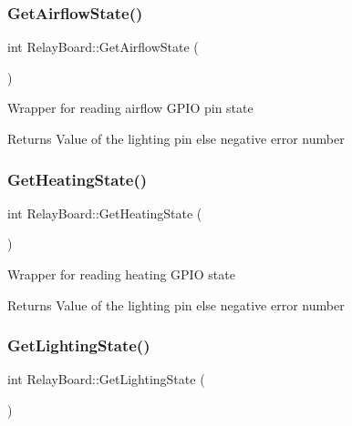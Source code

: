 \mbox{\label{classRelayBoard_a4b5cecaeadec360c688868a230a7d3a8}} 
\subsubsection{\texorpdfstring{Get\+Airflow\+State()}{GetAirflowState()}}
{\footnotesize\ttfamily int Relay\+Board\+::\+Get\+Airflow\+State (\begin{DoxyParamCaption}{ }\end{DoxyParamCaption})}

Wrapper for reading airflow G\+P\+IO pin state

\begin{DoxyReturn}{Returns}
Value of the lighting pin else negative error number 
\end{DoxyReturn}
\mbox{\label{classRelayBoard_a4725ac8db57d591dbe338f646cdda254}} 
\subsubsection{\texorpdfstring{Get\+Heating\+State()}{GetHeatingState()}}
{\footnotesize\ttfamily int Relay\+Board\+::\+Get\+Heating\+State (\begin{DoxyParamCaption}{ }\end{DoxyParamCaption})}

Wrapper for reading heating G\+P\+IO state

\begin{DoxyReturn}{Returns}
Value of the lighting pin else negative error number 
\end{DoxyReturn}
\mbox{\label{classRelayBoard_a32270d45de9d23698cf85fd3224f88c6}} 
\subsubsection{\texorpdfstring{Get\+Lighting\+State()}{GetLightingState()}}
{\footnotesize\ttfamily int Relay\+Board\+::\+Get\+Lighting\+State (\begin{DoxyParamCaption}{ }\end{DoxyParamCaption})}

